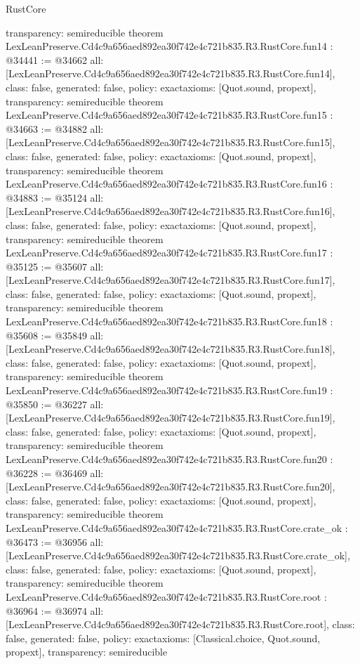 \begin{lexlean}{RustCore}
\begin{coremodule}
{  transparency: semireducible
}
theorem LexLeanPreserve.Cd4c9a656aed892ea30f742e4c721b835.R3.RustCore.fun14 : @34441 := @34662 {
  all: [LexLeanPreserve.Cd4c9a656aed892ea30f742e4c721b835.R3.RustCore.fun14],
  class: false,
  generated: false,
  policy: exact{axioms: [Quot.sound, propext]},
  transparency: semireducible
}
theorem LexLeanPreserve.Cd4c9a656aed892ea30f742e4c721b835.R3.RustCore.fun15 : @34663 := @34882 {
  all: [LexLeanPreserve.Cd4c9a656aed892ea30f742e4c721b835.R3.RustCore.fun15],
  class: false,
  generated: false,
  policy: exact{axioms: [Quot.sound, propext]},
  transparency: semireducible
}
theorem LexLeanPreserve.Cd4c9a656aed892ea30f742e4c721b835.R3.RustCore.fun16 : @34883 := @35124 {
  all: [LexLeanPreserve.Cd4c9a656aed892ea30f742e4c721b835.R3.RustCore.fun16],
  class: false,
  generated: false,
  policy: exact{axioms: [Quot.sound, propext]},
  transparency: semireducible
}
theorem LexLeanPreserve.Cd4c9a656aed892ea30f742e4c721b835.R3.RustCore.fun17 : @35125 := @35607 {
  all: [LexLeanPreserve.Cd4c9a656aed892ea30f742e4c721b835.R3.RustCore.fun17],
  class: false,
  generated: false,
  policy: exact{axioms: [Quot.sound, propext]},
  transparency: semireducible
}
theorem LexLeanPreserve.Cd4c9a656aed892ea30f742e4c721b835.R3.RustCore.fun18 : @35608 := @35849 {
  all: [LexLeanPreserve.Cd4c9a656aed892ea30f742e4c721b835.R3.RustCore.fun18],
  class: false,
  generated: false,
  policy: exact{axioms: [Quot.sound, propext]},
  transparency: semireducible
}
theorem LexLeanPreserve.Cd4c9a656aed892ea30f742e4c721b835.R3.RustCore.fun19 : @35850 := @36227 {
  all: [LexLeanPreserve.Cd4c9a656aed892ea30f742e4c721b835.R3.RustCore.fun19],
  class: false,
  generated: false,
  policy: exact{axioms: [Quot.sound, propext]},
  transparency: semireducible
}
theorem LexLeanPreserve.Cd4c9a656aed892ea30f742e4c721b835.R3.RustCore.fun20 : @36228 := @36469 {
  all: [LexLeanPreserve.Cd4c9a656aed892ea30f742e4c721b835.R3.RustCore.fun20],
  class: false,
  generated: false,
  policy: exact{axioms: [Quot.sound, propext]},
  transparency: semireducible
}
theorem LexLeanPreserve.Cd4c9a656aed892ea30f742e4c721b835.R3.RustCore.crate_ok : @36473 := @36956 {
  all: [LexLeanPreserve.Cd4c9a656aed892ea30f742e4c721b835.R3.RustCore.crate_ok],
  class: false,
  generated: false,
  policy: exact{axioms: [Quot.sound, propext]},
  transparency: semireducible
}
theorem LexLeanPreserve.Cd4c9a656aed892ea30f742e4c721b835.R3.RustCore.root : @36964 := @36974 {
  all: [LexLeanPreserve.Cd4c9a656aed892ea30f742e4c721b835.R3.RustCore.root],
  class: false,
  generated: false,
  policy: exact{axioms: [Classical.choice, Quot.sound, propext]},
  transparency: semireducible
}


\end{coremodule}
\end{lexlean}
